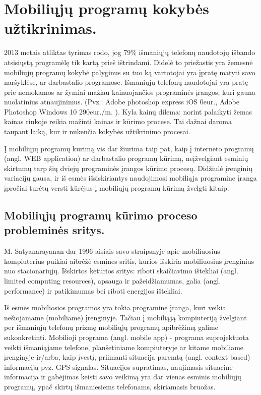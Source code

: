\documentclass{VUMIFPSkursinis}
\begin{document}
\section{Mobiliųjų programų kokybės užtikrinimas.}

2013 metais atliktas tyrimas \cite {compuware.com} rodo, jog 79\% išmaniųjų telefonų naudotojų išbando atsisiųstą programėlę tik kartą prieš ištrindami. Didelė to priežastis yra žemesnė mobiliųjų programų kokybė palyginus su tuo ką vartotojai yra įpratę matyti savo naršyklėse, ar darbastalio programose. Išmaniųjų telefonų naudotojai yra pratę prie nemokamos ar žymiai mažiau kainuojančios programinės įrangos, kuri gauna nuolatinius atnaujinimus. (Pvz.: Adobe photoshop express iOS 0eur., Adobe Photoshop Windows 10 290eur./m. \cite{adobe.com}). Kyla kainų dilema: norint palaikyti žemas kainas rinkoje reikia mažinti kainas ir kūrimo procese. Tai dažnai daroma taupant laiką, kur ir nukenčia kokybės užtikrinimo procesai.

Į mobiliųjų programų kūrimą vis dar žiūrima taip pat, kaip į interneto programų (angl. WEB application) ar darbastalio programų kūrimą, neįžvelgiant esminių skirtumų tarp šių dviejų programinės įrangos kūrimo procesų. Didžiulė įrenginių variacijų gausa, ir iš esmės išsiskiriantys naudojimosi mobiliąja programine įranga įpročiai turėtų versti kūrėjus į mobiliųjų programų kūrimą žvelgti kitaip.

\subsection{Mobiliųjų programų kūrimo proceso probleminės sritys.}
M. Satyanarayanan dar 1996-aisiais savo straipsnyje apie mobiliuosius kompiuterius puikiai aibrėžė esmines sritis, kurios išskiria mobiliuosius įrenginius nuo stacionariųjų. Išskirtos keturios sritys: riboti skaičiavimo ištekliai (angl. limited computing resources), apsauga ir pažeidžiamumas, galia (angl. performance) ir patikimumas bei riboti energijos ištekliai. \cite{Satyanarayanan:1996:FCM:248052.248053}

Iš esmės mobiliosios programos yra tokia programinė įranga, kuri veikia nešiojamame (mobiliame) įrenginyje. Tačiau į mobiliąją kompiuteriją žvelgiant per išmaniųjų telefonų prizmę mobiliųjų programų apibrėžimą galime sukonkretinti. Mobilioji programa (angl. mobile app) - programa suprojektuota veikti išmaniąjame telefone, planšetiniame kompiuteryje ar kitame mobiliame įrenginyje ir/arba, kaip įvestį, priimanti situacija paremtą (angl. context based) informaciją pvz. GPS signalas. \cite{6496451} Situacijos supratimas, naujimasis situacine informacija ir gabėjimas keisti savo veikimą yra dar vienas esminis mobiliųjų programų, ypač skirtų išmaniesiems telefonams, skiriamasis bruožas.
\end{document}
